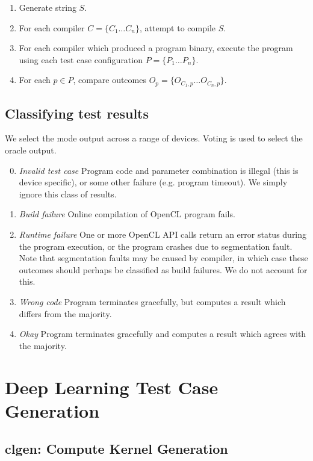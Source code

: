 \begin{enumerate}
	\item Generate string $S$.
	\item For each compiler $C = \{C_1 \ldots C_n\}$, attempt to compile $S$.
	\item For each compiler which produced a program binary, execute the program using each test case configuration $P = \{P_1 \ldots P_n\}$.
    \item For each $p \in P$, compare outcomes $O_p = \{ O_{C_1,p} \ldots O_{C_n,p} \}$.
\end{enumerate}


\subsection{Classifying test results}

We select the mode output across a range of devices. Voting is used to select the oracle output.
%
\begin{enumerate}
\setcounter{enumi}{-1}
\item \emph{Invalid test case} Program code and parameter combination is illegal (this is device specific), or some other failure (e.g. program timeout). We simply ignore this class of results.
\item \emph{Build failure} Online compilation of OpenCL program fails.
\item \emph{Runtime failure} One or more OpenCL API calls return an error status during the program execution, or the program crashes due to segmentation fault. Note that segmentation faults may be caused by compiler, in which case these outcomes should perhaps be classified as build failures. We do not account for this.
\item \emph{Wrong code} Program terminates gracefully, but computes a result which differs from the majority.
\item \emph{Okay} Program terminates gracefully and computes a result which agrees with the majority.
\end{enumerate}


\section{Deep Learning Test Case Generation}

\subsection{clgen: Compute Kernel Generation}

